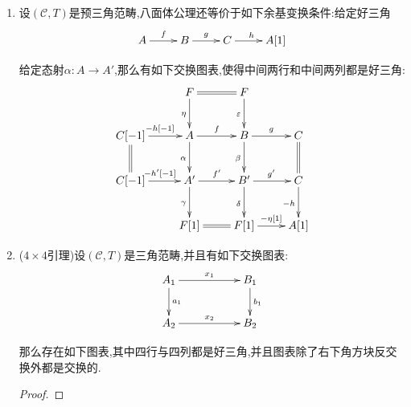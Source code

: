 \begin{enumerate}
\begin{proof}
    	$(\mathrm{TR}4')\Rightarrow$基变换:给定好三角$\xymatrix{A\ar[r]^f&B\ar[r]^g&C\ar[r]^h&A[1]}$和态射$\varepsilon:C'\to C$.考虑态射链$\xymatrix{C'\ar[r]^{\varepsilon}&C\ar[r]^h&A[1]}$,按照$\mathrm{TR}4'$得到如下交换图表,零七前两行和中间两列都是好三角,这得到基变换图表是交换的,并且基变换图表中中间两行和中间两列都是好三角.
    	$$\xymatrix{C'\ar[r]^{\varepsilon}\ar@{=}[d]&C\ar[r]^{\eta}\ar[d]_h&E[1]\ar[r]^{-\delta[1]}\ar[d]_{\alpha[1]}&C'[1]\ar@{=}[d]\\C'\ar[r]^{h'}&A[1]\ar[r]^{-f'[1]}\ar[d]_{f[1]}&B'\ar[r]^{-g'[1]}\ar[d]_{-\beta[1]}&C'[1]\ar[d]_{\varepsilon[1]}\\&B[1]\ar@{=}[r]\ar[d]_{g[1]}&B[1]\ar[r]^{g[1]}\ar[d]_{\gamma[1]}&C[1]\\&C[1]\ar[r]^{\eta[1]}&E[2]&}$$
    \end{proof}
    \item 设$(\mathscr{C},T)$是预三角范畴,八面体公理还等价于如下余基变换条件:给定好三角
    $$\xymatrix{A\ar[r]^f&B\ar[r]^g&C\ar[r]^h&A[1]}$$
    
    给定态射$\alpha:A\to A'$,那么有如下交换图表,使得中间两行和中间两列都是好三角:
    $$\xymatrix{&F\ar@{=}[r]\ar[d]_{\eta}&F\ar[d]_{\varepsilon}&\\C[-1]\ar@{=}[d]\ar[r]^{-h[-1]}&A\ar[r]^{f}\ar[d]_{\alpha}&B\ar[r]^{g}\ar[d]_{\beta}&C\ar@{=}[d]\\C[-1]\ar[r]^{-h'[-1]}&A'\ar[r]^{f'}\ar[d]_{\gamma}&B'\ar[r]^{g'}\ar[d]_{\delta}&C\ar[d]_{-h}\\&F[1]\ar@{=}[r]&F[1]\ar[r]^{-\eta[1]}&A[1]}$$
    \item ($4\times4$引理)设$(\mathscr{C},T)$是三角范畴,并且有如下交换图表:
    $$\xymatrix{A_1\ar[rr]^{x_1}\ar[d]^{a_1}&&B_1\ar[d]^{b_1}\\A_2\ar[rr]^{x_2}&&B_2}$$
    
    那么存在如下图表,其中四行与四列都是好三角,并且图表除了右下角方块反交换外都是交换的.
    \begin{proof}
    	

\end{proof}
\end{enumerate}

